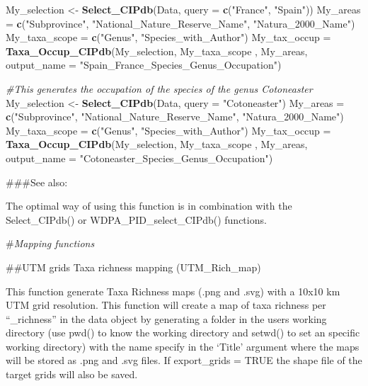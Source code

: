 \documentclass[
]{article}
\newenvironment{Shaded}{\begin{snugshade}}{\end{snugshade}}
\newcommand{\AttributeTok}[1]{\textcolor[rgb]{0.13,0.29,0.53}{#1}}
\newcommand{\CommentTok}[1]{\textcolor[rgb]{0.56,0.35,0.01}{\textit{#1}}}
\newcommand{\FunctionTok}[1]{\textcolor[rgb]{0.13,0.29,0.53}{\textbf{#1}}}
\newcommand{\NormalTok}[1]{#1}
\newcommand{\OtherTok}[1]{\textcolor[rgb]{0.56,0.35,0.01}{#1}}
\newcommand{\StringTok}[1]{\textcolor[rgb]{0.31,0.60,0.02}{#1}}
\begin{document}
\begin{Shaded}
\begin{Highlighting}[]
\NormalTok{My\_selection }\OtherTok{\textless{}{-}} \FunctionTok{Select\_CIPdb}\NormalTok{(Data, }\AttributeTok{query =} \FunctionTok{c}\NormalTok{(}\StringTok{"France"}\NormalTok{, }\StringTok{"Spain"}\NormalTok{))}
\NormalTok{My\_areas  }\OtherTok{=} \FunctionTok{c}\NormalTok{(}\StringTok{"Subprovince"}\NormalTok{, }\StringTok{"National\_Nature\_Reserve\_Name"}\NormalTok{, }\StringTok{"Natura\_2000\_Name"}\NormalTok{)}
\NormalTok{My\_taxa\_scope }\OtherTok{=} \FunctionTok{c}\NormalTok{(}\StringTok{"Genus"}\NormalTok{, }\StringTok{"Species\_with\_Author"}\NormalTok{)}
\NormalTok{My\_tax\_occup }\OtherTok{=} \FunctionTok{Taxa\_Occup\_CIPdb}\NormalTok{(My\_selection, My\_taxa\_scope , My\_areas, }\AttributeTok{output\_name =} \StringTok{"Spain\_France\_Species\_Genus\_Occupation"}\NormalTok{)}

\CommentTok{\#This generates the occupation of the species of the genus Cotoneaster}
\NormalTok{My\_selection }\OtherTok{\textless{}{-}} \FunctionTok{Select\_CIPdb}\NormalTok{(Data, }\AttributeTok{query =} \StringTok{"Cotoneaster"}\NormalTok{)}
\NormalTok{My\_areas  }\OtherTok{=} \FunctionTok{c}\NormalTok{(}\StringTok{"Subprovince"}\NormalTok{, }\StringTok{"National\_Nature\_Reserve\_Name"}\NormalTok{, }\StringTok{"Natura\_2000\_Name"}\NormalTok{)}
\NormalTok{My\_taxa\_scope }\OtherTok{=} \FunctionTok{c}\NormalTok{(}\StringTok{"Genus"}\NormalTok{, }\StringTok{"Species\_with\_Author"}\NormalTok{)}
\NormalTok{My\_tax\_occup }\OtherTok{=} \FunctionTok{Taxa\_Occup\_CIPdb}\NormalTok{(My\_selection, My\_taxa\_scope , My\_areas, }\AttributeTok{output\_name =} \StringTok{"Cotoneaster\_Species\_Genus\_Occupation"}\NormalTok{)}
\end{Highlighting}
\end{Shaded}

\#\#\#See also:

The optimal way of using this function is in combination with the
Select\_CIPdb() or WDPA\_PID\_select\_CIPdb() functions.

\#\emph{Mapping functions}

\#\#UTM grids Taxa richness mapping (UTM\_Rich\_map)

This function generate Taxa Richness maps (.png and .svg) with a 10x10
km UTM grid resolution. This function will create a map of taxa richness
per ``\_richness'' in the data object by generating a folder in the
users working directory (use pwd() to know the working directory and
setwd() to set an specific working directory) with the name specify in
the `Title' argument where the maps will be stored as .png and .svg
files. If export\_grids = TRUE the shape file of the target grids will
also be saved.
\end{document}
